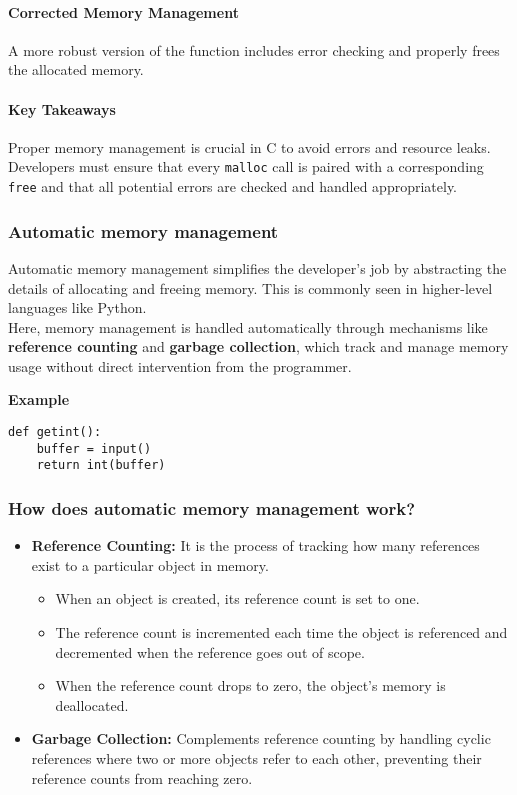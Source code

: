 \documentclass[12pt]{article}
\begin{document}
\paragraph{Corrected Memory Management}
A more robust version of the function includes error checking and properly frees the allocated memory.

\paragraph{Key Takeaways}

Proper memory management is crucial in C to avoid errors and resource leaks. Developers must ensure that every \texttt{malloc} call is paired with a corresponding \texttt{free} and that all potential errors are checked and handled appropriately.



\subsubsection{Automatic memory management}
Automatic memory management simplifies the developer's job by abstracting the details of allocating and freeing memory. This is commonly seen in higher-level languages like Python.\\
Here, memory management is handled automatically through mechanisms like \textbf{reference counting} and \textbf{garbage collection}, which track and manage memory usage without direct intervention from the programmer.


\textbf{Example}
\begin{verbatim}
def getint():
    buffer = input()
    return int(buffer)
\end{verbatim}

\subsubsection{How does automatic memory management work?}

\begin{itemize}
    \item \textbf{Reference Counting:} It is the process of tracking how many references exist to a particular object in memory.
    \begin{itemize}
        \item When an object is created, its reference count is set to one.
        \item The reference count is incremented each time the object is referenced and decremented when the reference goes out of scope.
        \item When the reference count drops to zero, the object's memory is deallocated.
    \end{itemize}
    \item \textbf{Garbage Collection:} Complements reference counting by handling cyclic references where two or more objects refer to each other, preventing their reference counts from reaching zero.
\end{itemize}
\end{document}
